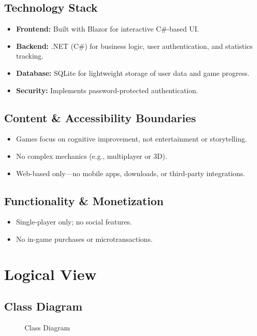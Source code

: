\documentclass[11pt,a4paper]{article}
\newcommand{\inputdiagram}[1]{}
\newcommand{\textwidthdiagram}[2][1]{%
  \resizebox{#1\textwidth}{!}{\inputdiagram{#2}}%
}
\begin{document}
\subsection{Technology Stack}
\begin{itemize}
    \item \textbf{Frontend:} Built with Blazor for interactive C\#-based UI.
    \item \textbf{Backend:} .NET (C\#) for business logic, user authentication, and statistics tracking.
    \item \textbf{Database:} SQLite for lightweight storage of user data and game progress.
    \item \textbf{Security:} Implements password-protected authentication.
\end{itemize}

\subsection{Content \& Accessibility Boundaries}
\begin{itemize}
    \item Games focus on cognitive improvement, not entertainment or storytelling.
    \item No complex mechanics (e.g., multiplayer or 3D).
    \item Web-based only—no mobile apps, downloads, or third-party integrations.
\end{itemize}

\subsection{Functionality \& Monetization}
\begin{itemize}
    \item Single-player only; no social features.
    \item No in-game purchases or microtransactions.
\end{itemize}



\section{Logical View}

\subsection{Class Diagram}

\begin{figure}[H]
    \centering
    \textwidthdiagram{class_diagram.latex}
    \caption{Class Diagram}
    \label{fig:Class Diagram}
\end{figure}
\end{document}
